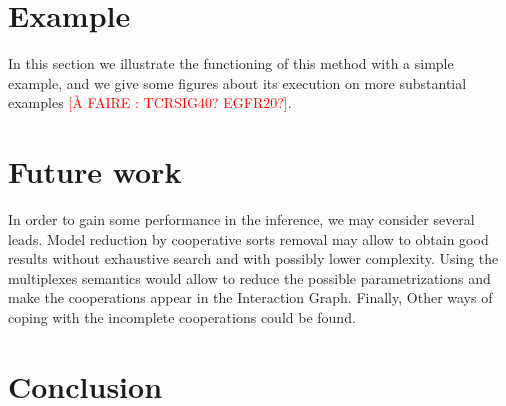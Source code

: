 \documentclass[fleqn]{llncs}
\newcommand{\afaire}[1]{\textcolor{red}{[À FAIRE : #1]}}
\begin{document}
\section{Example}
In this section we illustrate the functioning of this method with a simple example, and we give some figures about its execution on more substantial examples \afaire{TCRSIG40? EGFR20?}.

\section{Future work}
In order to gain some performance in the inference, we may consider several leads. Model reduction by cooperative sorts removal may allow to obtain good results without exhaustive search and with possibly lower complexity. Using the multiplexes semantics would allow to reduce the possible parametrizations and make the cooperations appear in the Interaction Graph. Finally, Other ways of coping with the incomplete cooperations could be found.

\section{Conclusion}
\end{document}
